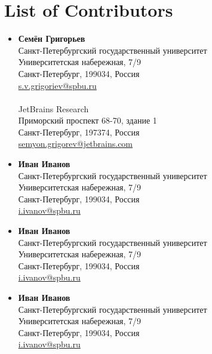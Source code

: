 ﻿\section{List of Contributors}

\begin{multicols}{2}
    \begin{itemize}
        \item \textbf{Семён Григорьев} \\
              Санкт-Петербургский государственный университет \\
              Университетская набережная, 7/9 \\
              Санкт-Петербург, 199034, Россия \\
              \url{s.v.grigoriev@spbu.ru}\\
              \\
              JetBrains Research \\
              Приморский проспект 68-70, здание 1 \\
              Санкт-Петербург, 197374, Россия \\
              \url{semyon.grigorev@jetbrains.com}


        \item \textbf{Иван Иванов} \\
              Санкт-Петербургский государственный университет \\
              Университетская набережная, 7/9 \\
              Санкт-Петербург, 199034, Россия \\
              \url{i.ivanov@spbu.ru}

        \item \textbf{Иван Иванов} \\
              Санкт-Петербургский государственный университет \\
              Университетская набережная, 7/9 \\
              Санкт-Петербург, 199034, Россия \\
              \url{i.ivanov@spbu.ru}

        \item \textbf{Иван Иванов} \\
              Санкт-Петербургский государственный университет \\
              Университетская набережная, 7/9 \\
              Санкт-Петербург, 199034, Россия \\
              \url{i.ivanov@spbu.ru}


\end{itemize}
\end{multicols}
